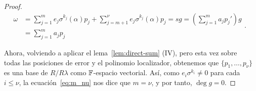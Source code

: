 \begin{proof}
\begin{equation}
\label{eq:m_nu}
\begin{aligned}
    \omega &= \sum_{j=1}^{m}e_{j}\sigma^{k_j}(\alpha)p_j + \sum_{j=m+1}^{\nu}e_{j}\sigma^{k_j}(\alpha)p_j = sg  = \left( \sum_{j=1}^{m}a_j p_j' \right) g \\
    &= \sum_{j=1}^{m} a_j p_j
\end{aligned}
.
\end{equation}

Ahora, volviendo a aplicar el lema~\ref{lem:direct-sum} (IV), pero esta vez sobre todas las posiciones de error y el polinomio localizador, obtenemos que \(\{p_1, \ldots, p_{\nu}\}\) es una base de \(R / R\lambda\) como  \(\mathbb{F}\)-espacio vectorial. Así, como \(e_i\sigma^{k_i} \neq 0\) para cada \(i \le \nu\), la ecuación~\ref{eq:m_nu} nos dice que \(m = \nu\), y por tanto, \(\deg g = 0\).
\end{proof}
